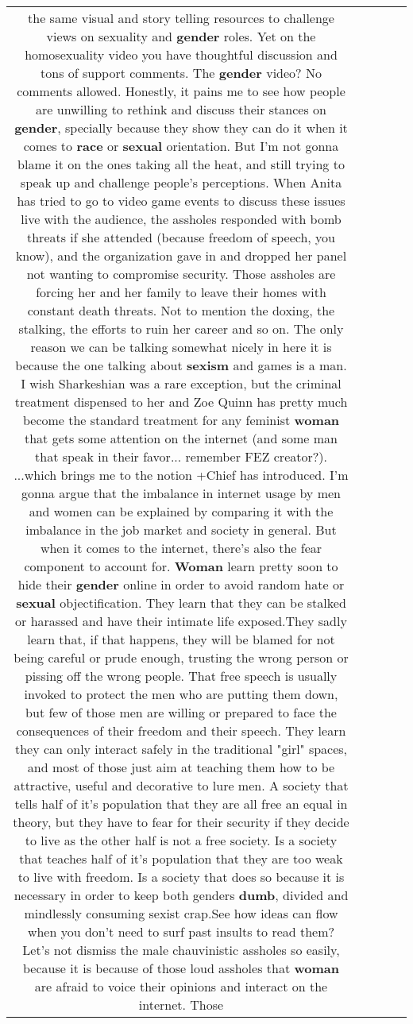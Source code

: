\documentclass[11pt]{article}
\newlength\mylength
\begin{document}
\begin{center}
\begin{longtable}{|C{.65\mylength}|C{.30\mylength}|C{.12\mylength}|C{.12\mylength}|C{.12\mylength}|}
the same visual and story telling resources to challenge views on sexuality and \textbf{gender} roles. Yet on the homosexuality video you have thoughtful discussion and tons of support comments. The \textbf{gender} video? No comments allowed. Honestly, it pains me to see how people are unwilling to rethink and discuss their stances on \textbf{gender},  specially because they show they can do it when it comes to \textbf{race} or \textbf{sexual} orientation. But I'm not gonna blame it on the ones taking all the heat, and still trying to speak up and challenge people's perceptions.    When Anita has tried to go to video game events to discuss these issues live with the audience, the assholes responded with bomb threats if she attended (because freedom of speech, you know), and the organization gave in and dropped her panel not wanting to compromise security.  Those assholes are forcing her and her family to leave their homes with constant death threats. Not to mention the doxing, the stalking, the efforts to ruin her career and so on. The only reason we can be talking somewhat nicely in here it is because the one talking about \textbf{sexism} and games is a man. I wish  Sharkeshian was a rare exception, but the criminal treatment dispensed to her and Zoe Quinn has pretty much become the standard treatment for any feminist \textbf{woman} that  gets some attention on the internet (and some man that speak in their favor... remember FEZ creator?).  ...which brings me to the notion +Chief has introduced. I'm gonna argue that the imbalance in internet usage by men and women can be explained by comparing it with the imbalance in the job market and society in general. But when it comes to the internet, there's also the fear component to account for. \textbf{Woman} learn pretty soon to hide their \textbf{gender} online in order to avoid random hate or \textbf{sexual} objectification. They learn that they can be stalked or harassed and have their intimate life exposed.They sadly learn that, if that happens, they will be blamed for not being careful or prude enough, trusting the wrong person or pissing off the wrong people. That free speech is usually invoked to protect the men who are putting them down, but few of those men are willing or prepared to face the consequences of their freedom and their speech. They learn they can only interact safely in the traditional "girl" spaces,  and most of those just aim at teaching them how to be attractive, useful and decorative to lure men.  A society that tells half of it's population that they are all free an equal in theory, but they have to fear for their security if they decide to live as the other half is not a free society. Is a society that teaches  half of it's population that they are too weak to live with freedom. Is a society that does so because it is necessary in order to keep both genders \textbf{dumb}, divided and mindlessly consuming sexist crap.See how ideas can flow when you don't need to surf past insults to read them?  Let's not dismiss the male chauvinistic assholes so easily,  because it is because of those loud assholes that \textbf{woman} are afraid to voice their opinions and interact on the internet. Those 
\end{longtable}
\end{center}
\end{document}
